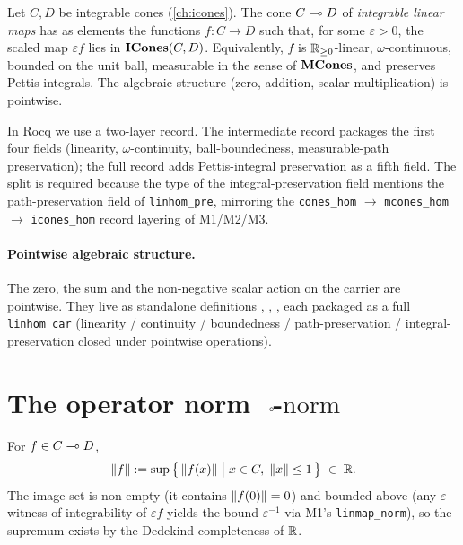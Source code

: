 \begin{definition}\label{def:linhom-car}
\rocqok{}
Let $C, D$ be integrable cones (\autoref{ch:icones}). The cone
$C \multimap D$ of \emph{integrable linear maps} has as elements the
functions $f : C \to D$ such that, for some $\varepsilon > 0$, the
scaled map $\varepsilon f$ lies in $\mathbf{ICones}(C, D)$. Equivalently,
$f$ is $\mathbb{R}_{\geq 0}$-linear, $\omega$-continuous, bounded on the unit ball,
measurable in the sense of $\mathbf{MCones}$, and preserves Pettis integrals.
The algebraic structure (zero, addition, scalar multiplication) is
pointwise.
\end{definition}

In Rocq we use a two-layer record. The intermediate record
 packages the first four fields
(linearity, $\omega$-continuity, ball-boundedness, measurable-path
preservation); the full record
 adds Pettis-integral
preservation as a fifth field. The split is required because the
type of the integral-preservation field mentions the
path-preservation field of \texttt{linhom\_pre}, mirroring the
\texttt{cones\_hom} $\to$ \texttt{mcones\_hom} $\to$ \texttt{icones\_hom}
record layering of M1/M2/M3.

\paragraph{Pointwise algebraic structure.}
The zero, the sum and the non-negative scalar action on the carrier
are pointwise. They live as standalone definitions
,
,
, each packaged as a full
\texttt{linhom\_car} (linearity / continuity / boundedness /
path-preservation / integral-preservation closed under pointwise
operations).

\section{The operator norm \texorpdfstring{$\multimap\!$}{->hom\!}-\texorpdfstring{$\!\text{norm}$}{\!norm}}\label{sec:linhom-norm}

\begin{definition}
\label{def:linhom-norm}
\rocqok{}
For $f \in C \multimap D$,
\[
  \lVert f \rVert := \sup\,\bigl\{\,\lVert f(x) \rVert \;\big|\; x \in C,\;
  \lVert x \rVert \le 1\,\bigr\}\;\in\;\mathbb{R}.
\]
The image set is non-empty (it contains $\lVert f(0) \rVert = 0$) and
bounded above (any $\varepsilon$-witness of integrability of
$\varepsilon f$ yields the bound $\varepsilon^{-1}$ via M1's
\texttt{linmap\_norm}), so the supremum exists by the Dedekind
completeness of $\mathbb{R}$.
\end{definition}

